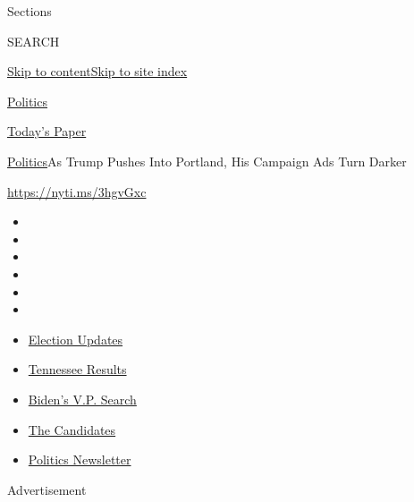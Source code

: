 Sections

SEARCH

\protect\hyperlink{site-content}{Skip to
content}\protect\hyperlink{site-index}{Skip to site index}

\href{https://www.nytimes.com/section/politics}{Politics}

\href{https://myaccount.nytimes.com/auth/login?response_type=cookie\&client_id=vi}{}

\href{https://www.nytimes.com/section/todayspaper}{Today's Paper}

\href{/section/politics}{Politics}\textbar{}As Trump Pushes Into
Portland, His Campaign Ads Turn Darker

\href{https://nyti.ms/3hgvGxc}{https://nyti.ms/3hgvGxc}

\begin{itemize}
\item
\item
\item
\item
\item
\item
\end{itemize}

\begin{itemize}
\item
  \href{https://www.nytimes.com/2020/08/07/us/elections/biden-vs-trump.html?action=click\&pgtype=Article\&state=default\&region=TOP_BANNER\&context=storylines_menu}{Election
  Updates}
\item
  \href{https://www.nytimes.com/interactive/2020/08/06/us/elections/results-tennessee-primary-elections.html?action=click\&pgtype=Article\&state=default\&region=TOP_BANNER\&context=storylines_menu}{Tennessee
  Results}
\item
  \href{https://www.nytimes.com/article/biden-vice-president-2020.html?action=click\&pgtype=Article\&state=default\&region=TOP_BANNER\&context=storylines_menu}{Biden's
  V.P. Search}
\item
  \href{https://www.nytimes.com/interactive/2019/us/politics/2020-presidential-candidates.html?action=click\&pgtype=Article\&state=default\&region=TOP_BANNER\&context=storylines_menu}{The
  Candidates}
\item
  \href{https://www.nytimes.com/newsletters/politics?action=click\&pgtype=Article\&state=default\&region=TOP_BANNER\&context=storylines_menu}{Politics
  Newsletter}
\end{itemize}

Advertisement

